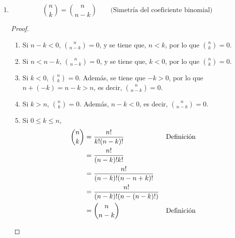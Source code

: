 \begin{enumerate}[label=\alph*)]
\pagebreak
  
  \item \[\binom{n}{k} = \binom{n}{n-k} \qquad \text{(Simetría del coeficiente binomial)}\]
  \begin{proof}\leavevmode
    \begin{enumerate}[label=\roman*)]
      \item Si $n-k<0$, $\binom{n}{n-k}=0$, y se tiene que, $n<k$, por lo que $\binom{n}{k}=0$.
      \item Si $n<n-k$, $\binom{n}{n-k}=0$, y se tiene que, $k<0$, por lo que $\binom{n}{k}=0$.
      \item Si $k<0$, $\binom{n}{k} = 0$. Además, se tiene que $-k>0$, por lo que $n+(-k)=n-k>n$, es decir, $\binom{n}{n-k} = 0$.
      \item Si $k>n$, $\binom{n}{k} = 0$. Además, $n-k<0$, es decir, $\binom{n}{n-k} = 0$.
      \item Si $0\leq k \leq n$,
      \begin{align*}
        \binom{n}{k} &= \frac{n!}{k!(n-k)!} && \text{Definición}\\
        &= \frac{n!}{(n-k)!k!}\\
        &= \frac{n!}{(n-k)!(n-n+k)!}\\
        &= \frac{n!}{(n-k)!(n-(n-k)!)}\\
        &= \binom{n}{n-k} && \text{Definición} \qedhere
      \end{align*}
    \end{enumerate}
  \end{proof}


\end{enumerate}
